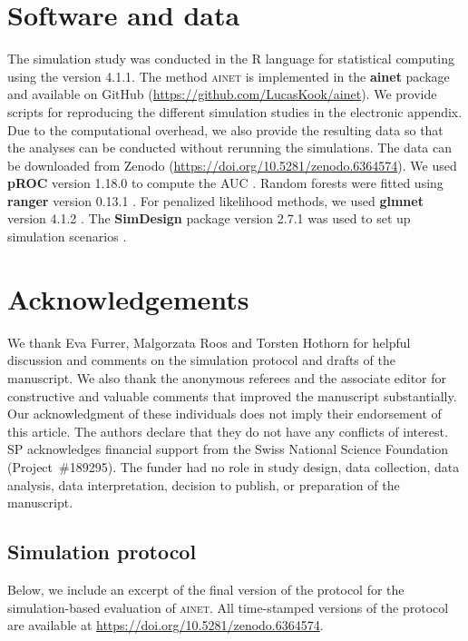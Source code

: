 \documentclass[a4paper, 11pt]{article}
\newcommand{\ainet}{\textsc{ainet}}
\newcommand{\pkg}[1]{\textbf{#1}}
\begin{document}
\section*{Software and data}
The simulation study was conducted in the \textsf{R} language for statistical
computing \citep{pkg:base} using the version 4.1.1. The method \ainet{} is
implemented in the \pkg{ainet} package and available on GitHub
(\url{https://github.com/LucasKook/ainet}). We provide scripts for reproducing
the different simulation studies in the electronic appendix. Due to the
computational overhead, we also provide the resulting data so that the analyses
can be conducted without rerunning the simulations. The data can be downloaded
from Zenodo (\url{https://doi.org/10.5281/zenodo.6364574}). We used \pkg{pROC}
version 1.18.0 to compute the AUC \citep{pkg:proc}. Random forests were fitted
using \pkg{ranger} version 0.13.1 \citep{ranger2017}. For penalized likelihood
methods, we used \pkg{glmnet} version 4.1.2 \citep{Friedman2010,Simon2011}. The
\pkg{SimDesign} package version 2.7.1 was used to set up simulation scenarios
\citep{Chalmers2020}.

\section*{Acknowledgements}
We thank Eva Furrer, Malgorzata Roos and Torsten Hothorn for helpful discussion
and comments on the simulation protocol and drafts of the manuscript. We also
thank the anonymous referees and the associate editor for constructive and
valuable comments that improved the manuscript substantially. Our acknowledgment
of these individuals does not imply their endorsement of this article. The
authors declare that they do not have any conflicts of interest. SP acknowledges
financial support from the Swiss National Science Foundation (Project~\#189295).
The funder had no role in study design, data collection, data analysis, data
interpretation, decision to publish, or preparation of the manuscript.

\begin{appendices}

\section{Simulation protocol}
\label{appendix:protocol}

Below, we include an excerpt of the final version of the protocol for the
simulation-based evaluation of \ainet{}. All time-stamped versions of the
protocol are available at \url{https://doi.org/10.5281/zenodo.6364574}.



\end{appendices}



\end{document}
